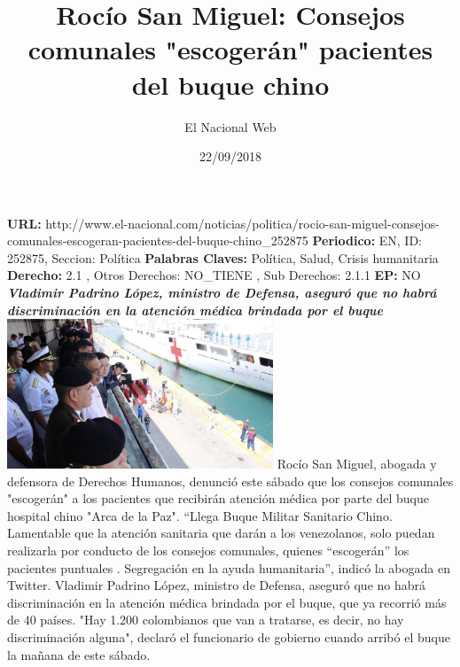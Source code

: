 \documentclass{article}%
\title{\textbf{Rocío San Miguel: Consejos comunales "escogerán" pacientes del buque chino}}%
\author{El Nacional Web}%
\date{22/09/2018}%
\begin{document}
%
\normalsize%
\maketitle%
\textbf{URL: }%
http://www.el{-}nacional.com/noticias/politica/rocio{-}san{-}miguel{-}consejos{-}comunales{-}escogeran{-}pacientes{-}del{-}buque{-}chino\_252875\newline%
%
\textbf{Periodico: }%
EN, %
ID: %
252875, %
Seccion: %
Política\newline%
%
\textbf{Palabras Claves: }%
Política, Salud, Crisis humanitaria\newline%
%
\textbf{Derecho: }%
2.1%
, Otros Derechos: %
NO\_TIENE%
, Sub Derechos: %
2.1.1%
\newline%
%
\textbf{EP: }%
NO\newline%
\newline%
%
\textbf{\textit{Vladimir Padrino López, ministro de Defensa, aseguró que no habrá discriminación en la atención médica brindada por el buque}}%
\newline%
\newline%
%
\includegraphics[width=300px]{7.jpg}%
\newline%
%
Rocío San Miguel, abogada y defensora de Derechos Humanos, denunció este sábado que los consejos comunales "escogerán" a los pacientes que recibirán atención médica por parte del buque hospital chino "Arca de la Paz".%
\newline%
%
“Llega Buque Militar Sanitario Chino. Lamentable que la atención sanitaria que darán a los venezolanos, solo puedan realizarla por conducto de los consejos comunales, quienes “escogerán” los pacientes puntuales . Segregación en la ayuda humanitaria”, indicó la abogada en Twitter.%
\newline%
%
Vladimir Padrino López, ministro de Defensa, aseguró que no habrá discriminación en la atención médica brindada por el buque, que ya recorrió más de 40 países.%
\newline%
%
"Hay 1.200 colombianos que van a tratarse, es decir, no hay discriminación alguna", declaró el funcionario de gobierno cuando arribó el buque la mañana de este sábado.%
\newline%
%
\end{document}
